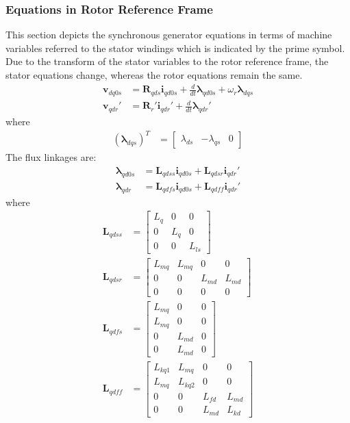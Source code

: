 \subsubsection{Equations in Rotor Reference Frame}

This section depicts the synchronous generator equations in terms of machine variables referred to the stator windings which is indicated by the prime symbol. Due to the transform of the stator variables to the rotor reference frame, the stator equations change, whereas the rotor equations remain the same.
%
\begin{align}
  \mathbf{v}_{dq0s} &= \mathbf{R}_{qds} \mathbf{i}_{qd0s} + \frac{d}{dt} \boldsymbol{\lambda}_{qd0s} + \omega_r \boldsymbol{\lambda}_{dqs} \\
  \mathbf{v}_{qdr}' &= \mathbf{R}_r' \mathbf{i}_{qdr}' + \frac{d}{dt}  \boldsymbol{\lambda}_{qdr}'
\end{align}
%
where
%
\begin{align}
  (\boldsymbol{\lambda}_{dqs})^T &= 
  \begin{bmatrix}
    \lambda_{ds} & -\lambda_{qs} & 0
  \end{bmatrix}
\end{align}
%
The flux linkages are:
%
\begin{align}
  \boldsymbol{\lambda}_{qd0s} &= \mathbf{L}_{qdss} \mathbf{i}_{qd0s} + \mathbf{L}_{qdsr} \mathbf{i}_{qdr}'  \\
  \boldsymbol{\lambda}_{qdr} &= \mathbf{L}_{qdfs} \mathbf{i}_{qd0s} + \mathbf{L}_{qdff} \mathbf{i}_{qdr}'
\end{align}
%
where
%
\begin{align}
  \mathbf{L}_{qdss} &= 
  \begin{bmatrix}
    L_{q} & 0 & 0 \\
    0 & L_{q} & 0 \\
    0 & 0 & L_{ls}
  \end{bmatrix} \\
  \mathbf{L}_{qdsr} &= 
  \begin{bmatrix}
    L_{mq} & L_{mq} & 0 & 0 \\
    0 & 0 & L_{md} & L_{md} \\
    0 & 0 & 0 & 0
  \end{bmatrix} \\
  \mathbf{L}_{qdfs} &=
  \begin{bmatrix}
    L_{mq} & 0 & 0 \\
    L_{mq} & 0 & 0 \\
    0 & L_{md} & 0 \\
    0 & L_{md} & 0
  \end{bmatrix} \\
  \mathbf{L}_{qdff} &=
  \begin{bmatrix}
    L_{kq1} & L_{mq} & 0 & 0 \\
    L_{mq} & L_{kq2} & 0 & 0 \\
    0 & 0 & L_{fd} & L_{md} \\
    0 & 0 & L_{md} & L_{kd}
  \end{bmatrix} \\
\end{align}
